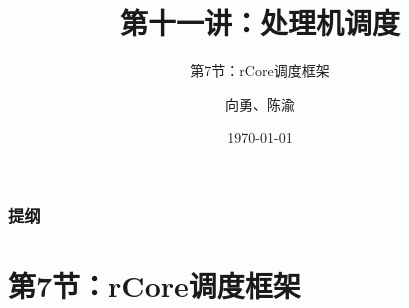 



\title[第10讲]{第十一讲：处理机调度} %
\subtitle{第7节：rCore调度框架}
\author{向勇、陈渝} %
\date{\today} %



\begin{frame}
\titlepage %
\end{frame}
\begin{frame}
\frametitle{提纲} %
\tableofcontents %
\end{frame}
\section{第7节：rCore调度框架}%
